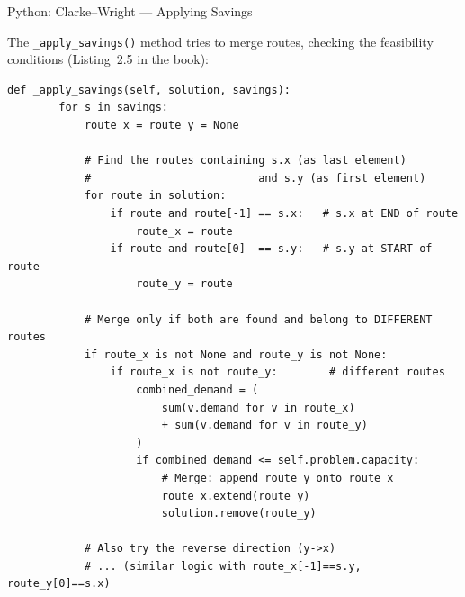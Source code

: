 \documentclass[aspectratio=169,10pt]{beamer}
\begin{document}
\begin{frame}[fragile]{Python: Clarke--Wright --- Applying Savings}

  The \texttt{\_apply\_savings()} method tries to merge routes, checking the
  feasibility conditions (Listing~2.5 in the book):

\begin{lstlisting}[caption={Clarke--Wright: applying savings to merge routes}]
    def _apply_savings(self, solution, savings):
        for s in savings:
            route_x = route_y = None

            # Find the routes containing s.x (as last element)
            #                          and s.y (as first element)
            for route in solution:
                if route and route[-1] == s.x:   # s.x at END of route
                    route_x = route
                if route and route[0]  == s.y:   # s.y at START of route
                    route_y = route

            # Merge only if both are found and belong to DIFFERENT routes
            if route_x is not None and route_y is not None:
                if route_x is not route_y:        # different routes
                    combined_demand = (
                        sum(v.demand for v in route_x)
                        + sum(v.demand for v in route_y)
                    )
                    if combined_demand <= self.problem.capacity:
                        # Merge: append route_y onto route_x
                        route_x.extend(route_y)
                        solution.remove(route_y)

            # Also try the reverse direction (y->x)
            # ... (similar logic with route_x[-1]==s.y, route_y[0]==s.x)
\end{lstlisting}

\end{frame}
\end{document}
